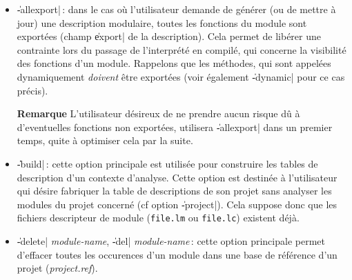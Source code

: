 \begin{itemize}

\item {\Large \|-allexport|}\,: dans le cas o\`{u} l'utilisateur demande de
g\'{e}n\'{e}rer (ou de mettre \`{a} jour) une description modulaire, toutes les
fonctions du module sont export\'{e}es (champ \|export| de la
description). Cela permet de lib\'{e}rer une contrainte lors du passage
de l'interpr\'{e}t\'{e} en compil\'{e}, qui concerne la visibilit\'{e} des
fonctions d'un module. Rappelons que les m\'{e}thodes, qui sont
appel\'{e}es dynamiquement {\em doivent} \^{e}tre export\'{e}es (voir
\'{e}galement \|-dynamic| pour ce cas pr\'{e}cis).
\begin{Side} {\bf Remarque}
L'utilisateur d\'{e}sireux de ne prendre aucun risque d\^{u} \`{a}
d'eventuelles fonctions non export\'{e}es, utilisera \|-allexport| dans
un premier temps, quite \`{a} optimiser cela par la suite.
\end{Side}

\item {\Large \|-build|}\,: cette option principale est utilis\'{e}e pour
construire les tables de description d'un contexte d'analyse. 
Cette option est destin\'{e}e \`{a} l'utilisateur 
qui d\'{e}sire fabriquer la table de descriptions de son projet sans
analyser les modules du projet concern\'{e} (cf option \|-project|). Cela
suppose donc que les fichiers descripteur de module ({\tt file.lm} ou
{\tt file.lc}) existent d\'{e}j\`{a}.

\item {\Large \|-delete| {\em module-name}, \|-del| {\em
module-name}}\,: cette option principale 
permet d'effacer toutes les occurences d'un module dans une base de
r\'{e}f\'{e}rence d'un projet ({\it project.ref}).


\end{itemize}
